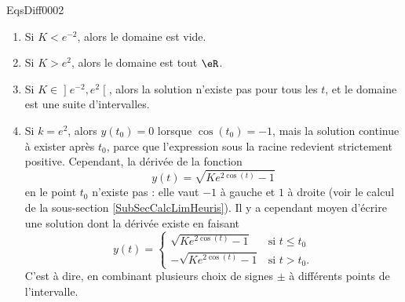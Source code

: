 \begin{corrige}{EqsDiff0002}
\begin{enumerate}
\begin{enumerate}
\item
Si $K<e^{-2}$, alors le domaine est vide.
\item
Si $K>e^2$, alors le domaine est tout $\eR$.
\item
Si $K\in\mathopen]e^{-2},e^2\mathclose[$, alors la solution n'existe pas pour tous les $t$, et le domaine est une suite d'intervalles.
\item
Si $k=e^2$, alors $y(t_0)=0$ lorsque $\cos(t_0)=-1$, mais la solution continue à exister après $t_0$, parce que l'expression sous la racine redevient strictement positive. Cependant, la dérivée de la fonction
\begin{equation}
	y(t)=\sqrt{K e^{2\cos(t)}-1}
\end{equation}
en le point $t_0$ n'existe pas  : elle vaut $-1$ à gauche et $1$ à droite (voir le calcul de la sous-section \ref{SubSecCalcLimHeuris}). Il y a cependant moyen d'écrire une solution dont la dérivée existe en faisant
\begin{equation}
	y(t)=\begin{cases}
	\sqrt{Ke^{2\cos(t)}-1}	&	\text{si $t\leq t_0$}\\
	-\sqrt{Ke^{2\cos(t)}-1}		&	 \text{si $t> t_0$.}
\end{cases}
\end{equation}
C'est à dire, en combinant plusieurs choix de signes $\pm$ à différents points de l'intervalle.

\end{enumerate}
\end{enumerate}

\end{corrige}
